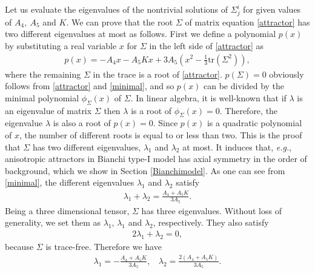 \documentclass[aps,prd,preprint,superscriptaddress,nofootinbib,tightenlines]{revtex4-1}
\begin{document}
Let us evaluate the eigenvalues of the nontrivial solutions of $\Sigma^i_j$ for
given values of $A_4,~A_5$ and $K$.
We can prove that the root $\Sigma$ of matrix equation \eqref{attractor}
has two different eigenvalues at most as follows.
First we define a polynomial $p(x)$ by substituting a real variable $x$ for $\Sigma$ in the left side of \eqref{attractor} as
\begin{eqnarray}
p(x) = -A_4 x - A_5 K x + 3 A_5 \left( x^2 -\frac{1}{3} \mathrm{tr}\!\left(\Sigma^2\right) \right) , \label{minimal}
\end{eqnarray}
where the remaining $\Sigma$ in the trace is a root of \eqref{attractor}.
$p(\Sigma)=0$ obviously follows from \eqref{attractor} and \eqref{minimal},
and so $p(x)$ can be divided by the minimal polynomial $\phi_\Sigma(x)$ of $\Sigma$.
In linear algebra, it is well-known that if $\lambda$ is an eigenvalue of matrix $\Sigma$ then $\lambda$ is a root of $\phi_\Sigma(x)=0$.
Therefore, the eigenvalue $\lambda$ is also a root of $p(x)=0$.
Since $p(x)$ is a quadratic polynomial of $x$, the number of different roots is equal to or less than two.
This is the proof that $\Sigma$ has two different eigenvalues, $\lambda_1$ and $\lambda_2$ at most.
It induces that, \textit{e.g.}, anisotropic attractors in Bianchi type-I model has axial symmetry in the order of background,
which we show in Section \ref{Bianchimodel}.
As one can see from \eqref{minimal}, the different eigenvalues $\lambda_1$ and $\lambda_2$ satisfy
\begin{eqnarray}
\lambda_1 + \lambda_2
=
\frac{A_4+A_5 K}{3A_5}.
\end{eqnarray}
Being a three dimensional tensor, $\Sigma$ has three eigenvalues.
Without loss of generality, we set them as $\lambda_1$, $\lambda_1$ and $\lambda_2$, respectively. They also satisfy
\begin{eqnarray}
2 \lambda_1 + \lambda_2 = 0,
\end{eqnarray}
because $\Sigma$ is trace-free. Therefore we have
\begin{eqnarray}
\lambda_1 = -\frac{A_4+A_5K}{3A_5}
,~~~~
\lambda_2 = \frac{2(A_4+A_5K)}{3A_5}.
\label{eigenvalues}
\end{eqnarray}
\end{document}
